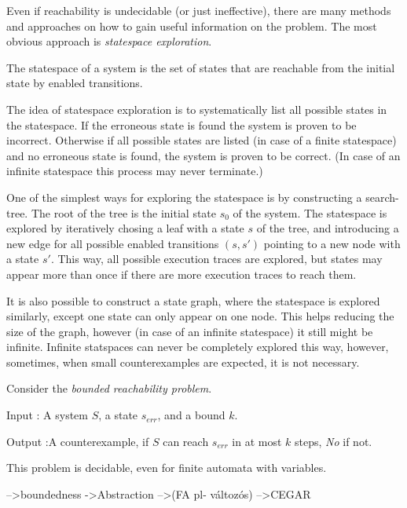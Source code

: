 Even if reachability is undecidable (or just ineffective), there are many methods and approaches on how to gain useful information on the problem. The most obvious approach is \emph{statespace exploration}.

\begin{dfn}
	The statespace of a system is the set of states that are reachable from the initial state by enabled transitions. 
\end{dfn}

The idea of statespace exploration is to systematically list all possible states in the statespace. If the erroneous state is found the system is proven to be incorrect. Otherwise if all possible states are listed (in case of a finite statespace) and no erroneous state is found, the system is proven to be correct. (In case of an infinite statespace this process may never terminate.)

One of the simplest ways for exploring the statespace is by constructing a search-tree. The root of the tree is the initial state $s_0$ of the system. The statespace is explored by iteratively chosing a leaf with a state $s$ of the tree, and introducing a new edge for all possible enabled transitions $(s,s')$ pointing to a new node with a state $s'$. This way, all possible execution traces are explored, but states may appear more than once if there are more execution traces to reach them.

It is also possible to construct a state graph, where the statespace is explored similarly, except one state can only appear on one node. This helps reducing the size of the graph, however (in case of an infinite statespace) it still might be infinite. Infinite statspaces can never be completely explored this way, however, sometimes, when small counterexamples are expected, it is not necessary.

Consider the \emph{bounded reachability problem}.
\begin{descripton}
	\item[Input]: A system $S$, a state $s_{err}$, and a bound $k$.
	\item[Output]:A counterexample, if $S$ can reach $s_{err}$ in at most $k$ steps, \emph{No} if not.
\end{descripton}

This problem is decidable, even for finite automata with variables.


-->boundedness
->Abstraction
-->(FA pl- változós)
-->CEGAR

